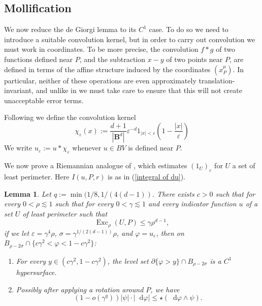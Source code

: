 \documentclass[reqno,10pt]{amsart}
\newcommand{\Ball}{\mathbf{B}}
\DeclareMathOperator{\Exc}{Exc}
\newcommand*\dif{\mathop{}\!\mathrm{d}}
\newtheorem{lemma}[theorem]{Lemma}
\theoremstyle{definition}
\numberwithin{equation}{section}
\begin{document}
\subsection{Mollification}
We now reduce the de Giorgi lemma to its $C^1$ case.
To do so we need to introduce a suitable convolution kernel, but in order to carry out convolution we must work in coordinates.
To be more precise, the convolution $f * g$ of two functions defined near $P$, and the subtraction $x - y$ of two points near $P$, are defined in terms of the affine structure induced by the coordinates $(x^\mu_P)$.
In particular, neither of these operations are even approximately translation-invariant, and unlike in \cite{Giusti77} we must take care to ensure that this will not create unacceptable error terms.

Following \cite[Chapter 7]{Giusti77} we define the convolution kernel
$$\chi_\varepsilon(x) := \frac{d + 1}{|\Ball^d|} \varepsilon^{-d}1_{|x| < \varepsilon} \left(1 - \frac{|x|}{\varepsilon}\right)$$
We write $u_\varepsilon := u * \chi_\varepsilon$ whenever $u \in BV$ is defined near $P$.

We now prove a Riemannian analogue of \cite[Theorem 7.3]{Giusti77}, which estimates $(1_U)_\varepsilon$ for $U$ a set of least perimeter.
Here $I(u, P, r)$ is as in (\ref{integral of du}).

\begin{lemma}\label{main mollifier lemma}
Let $q := \min(1/8, 1/(4(d - 1))$.
There exists $c > 0$ such that for every $0 < \rho \lesssim 1$ such that for every $0 < \gamma \lesssim 1$ and every indicator function $u$ of a set $U$ of least perimeter such that
\begin{equation}\label{hypothesis on main mollifier lemma}
\Exc_\rho(U, P) \leq \gamma \rho^{d - 1},
\end{equation}
if we let $\varepsilon = \gamma^4\rho$, $\sigma = \gamma^{1/(2(d - 1))}\rho$, and $\varphi = u_\varepsilon$, then on $B_{\rho - 2\sigma} \cap \{c\gamma^2 < \varphi < 1 - c\gamma^2\}$:
\begin{enumerate}
\item For every $y \in (c\gamma^2, 1 - c\gamma^2)$, the level set $\partial \{\varphi > y\} \cap B_{\rho - 2\sigma}$ is a $C^1$ hypersurface.
\item Possibly after applying a rotation around $P$, we have
\begin{equation}\label{claim on main mollifier lemma}
(1 - o(\gamma^q)) |\psi| \cdot |\dif \varphi| \leq \star(\dif \varphi \wedge \psi).
\end{equation}
\end{enumerate}
\end{lemma}
\end{document}
